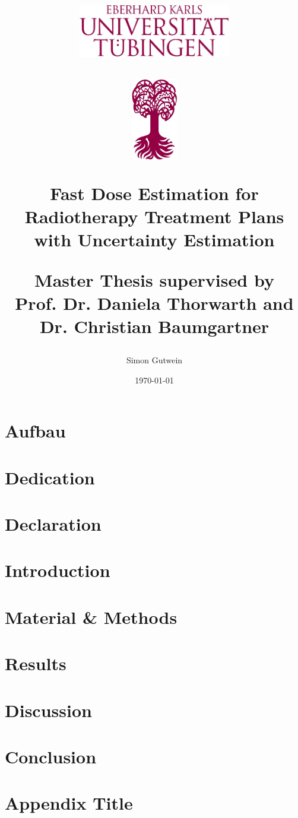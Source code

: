 \documentclass[12pt]{report}
\title{
	\centering
	\includegraphics[width=0.5\textwidth]{logo4}\par\vspace{1cm}
	\includegraphics[width=0.15\textwidth]{logo3}\par\vspace{1cm}
	{\huge\bfseries Fast Dose Estimation for Radiotherapy Treatment Plans with Uncertainty Estimation\par}
	\vspace{1cm}
	{\fontsize{20.74}{0}\selectfont Master Thesis}\vspace{3cm}
	\vfill
	{\fontsize{17}{18}\selectfont supervised by \fontsize{17}{18}\selectfont\\ Prof. Dr. Daniela Thorwarth and Dr. Christian Baumgartner}
	\vfill
}
\author{Simon Gutwein}
\date{\today}
\begin{document}
\maketitle

\chapter{Aufbau}


% 

\chapter{Dedication}


\chapter{Declaration}


\tableofcontents
\listoffigures
\listoftables

\chapter{Introduction}


\chapter{Material \& Methods}


\chapter{Results}


\chapter{Discussion}


\chapter{Conclusion}


\printbibliography

\appendix
\chapter{Appendix Title}

\end{document}
